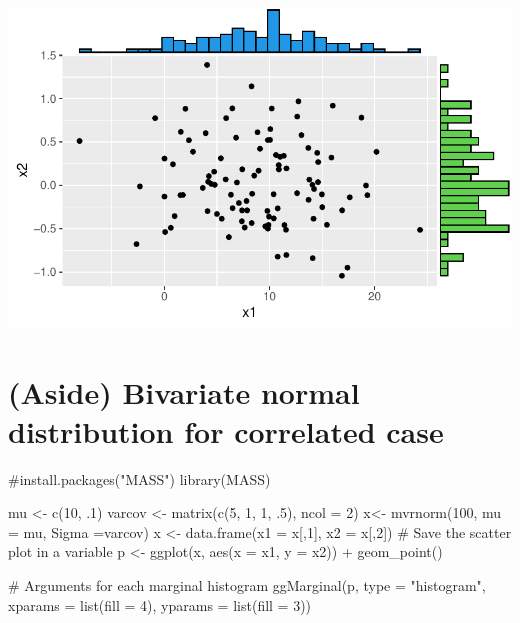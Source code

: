 \documentclass[
  letterpaper,
  DIV=11,
  numbers=noendperiod]{scrreprt}
\newenvironment{Shaded}{\begin{snugshade}}{\end{snugshade}}
\newcommand{\AttributeTok}[1]{\textcolor[rgb]{0.40,0.45,0.13}{#1}}
\newcommand{\CommentTok}[1]{\textcolor[rgb]{0.37,0.37,0.37}{#1}}
\newcommand{\DecValTok}[1]{\textcolor[rgb]{0.68,0.00,0.00}{#1}}
\newcommand{\FunctionTok}[1]{\textcolor[rgb]{0.28,0.35,0.67}{#1}}
\newcommand{\NormalTok}[1]{\textcolor[rgb]{0.00,0.23,0.31}{#1}}
\newcommand{\OtherTok}[1]{\textcolor[rgb]{0.00,0.23,0.31}{#1}}
\newcommand{\SpecialCharTok}[1]{\textcolor[rgb]{0.37,0.37,0.37}{#1}}
\newcommand{\StringTok}[1]{\textcolor[rgb]{0.13,0.47,0.30}{#1}}
\begin{document}
\includegraphics{LectureNotes/Lecture2_files/figure-pdf/unnamed-chunk-1-1.pdf}

\section{\texorpdfstring{{(Aside) Bivariate normal distribution for
correlated
case}}{(Aside) Bivariate normal distribution for correlated case}}\label{aside-bivariate-normal-distribution-for-correlated-case}

\begin{Shaded}
\begin{Highlighting}[]
\CommentTok{\#install.packages("MASS")}
\FunctionTok{library}\NormalTok{(MASS)}

\NormalTok{mu }\OtherTok{\textless{}{-}} \FunctionTok{c}\NormalTok{(}\DecValTok{10}\NormalTok{, .}\DecValTok{1}\NormalTok{)}
\NormalTok{varcov }\OtherTok{\textless{}{-}} \FunctionTok{matrix}\NormalTok{(}\FunctionTok{c}\NormalTok{(}\DecValTok{5}\NormalTok{, }\DecValTok{1}\NormalTok{, }\DecValTok{1}\NormalTok{, .}\DecValTok{5}\NormalTok{), }
                 \AttributeTok{ncol =} \DecValTok{2}\NormalTok{)}
\NormalTok{x}\OtherTok{\textless{}{-}} \FunctionTok{mvrnorm}\NormalTok{(}\DecValTok{100}\NormalTok{, }\AttributeTok{mu =}\NormalTok{ mu, }\AttributeTok{Sigma =}\NormalTok{varcov)}
\NormalTok{x }\OtherTok{\textless{}{-}} \FunctionTok{data.frame}\NormalTok{(}\AttributeTok{x1 =}\NormalTok{ x[,}\DecValTok{1}\NormalTok{], }\AttributeTok{x2 =}\NormalTok{ x[,}\DecValTok{2}\NormalTok{])}
\CommentTok{\# Save the scatter plot in a variable}
\NormalTok{p }\OtherTok{\textless{}{-}} \FunctionTok{ggplot}\NormalTok{(x, }\FunctionTok{aes}\NormalTok{(}\AttributeTok{x =}\NormalTok{ x1, }\AttributeTok{y =}\NormalTok{ x2)) }\SpecialCharTok{+}
  \FunctionTok{geom\_point}\NormalTok{()}

\CommentTok{\# Arguments for each marginal histogram}
\FunctionTok{ggMarginal}\NormalTok{(p, }\AttributeTok{type =} \StringTok{"histogram"}\NormalTok{, }
           \AttributeTok{xparams =} \FunctionTok{list}\NormalTok{(}\AttributeTok{fill =} \DecValTok{4}\NormalTok{),}
           \AttributeTok{yparams =} \FunctionTok{list}\NormalTok{(}\AttributeTok{fill =} \DecValTok{3}\NormalTok{))}
\end{Highlighting}
\end{Shaded}
\end{document}
